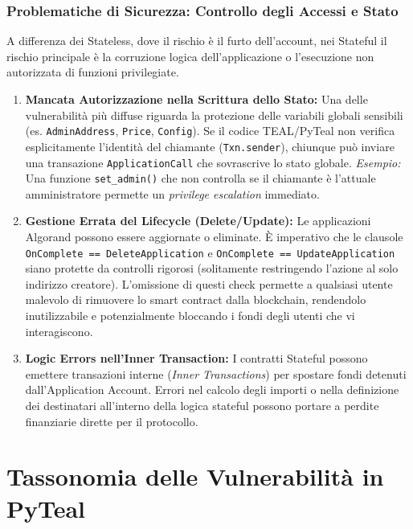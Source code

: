\subsubsection{Problematiche di Sicurezza: Controllo degli Accessi e Stato}
A differenza dei Stateless, dove il rischio è il furto dell'account, nei Stateful il rischio principale è la corruzione logica dell'applicazione o l'esecuzione non autorizzata di funzioni privilegiate.

\begin{enumerate}
    \item \textbf{Mancata Autorizzazione nella Scrittura dello Stato:}
    Una delle vulnerabilità più diffuse riguarda la protezione delle variabili globali sensibili (es. \texttt{AdminAddress}, \texttt{Price}, \texttt{Config}). Se il codice TEAL/PyTeal non verifica esplicitamente l'identità del chiamante (\texttt{Txn.sender}), chiunque può inviare una transazione \texttt{ApplicationCall} che sovrascrive lo stato globale.
    \textit{Esempio:} Una funzione \texttt{set\_admin()} che non controlla se il chiamante è l'attuale amministratore permette un \textit{privilege escalation} immediato.
    
    \item \textbf{Gestione Errata del Lifecycle (Delete/Update):}
    Le applicazioni Algorand possono essere aggiornate o eliminate. È imperativo che le clausole \texttt{OnComplete == DeleteApplication} e \texttt{OnComplete == UpdateApplication} siano protette da controlli rigorosi (solitamente restringendo l'azione al solo indirizzo creatore). L'omissione di questi check permette a qualsiasi utente malevolo di rimuovere lo smart contract dalla blockchain, rendendolo inutilizzabile e potenzialmente bloccando i fondi degli utenti che vi interagiscono.
    
    \item \textbf{Logic Errors nell'Inner Transaction:}
    I contratti Stateful possono emettere transazioni interne (\textit{Inner Transactions}) per spostare fondi detenuti dall'Application Account. Errori nel calcolo degli importi o nella definizione dei destinatari all'interno della logica stateful possono portare a perdite finanziarie dirette per il protocollo.
\end{enumerate}

\section{Tassonomia delle Vulnerabilità in PyTeal}
\label{sec:vulnerabilita}

